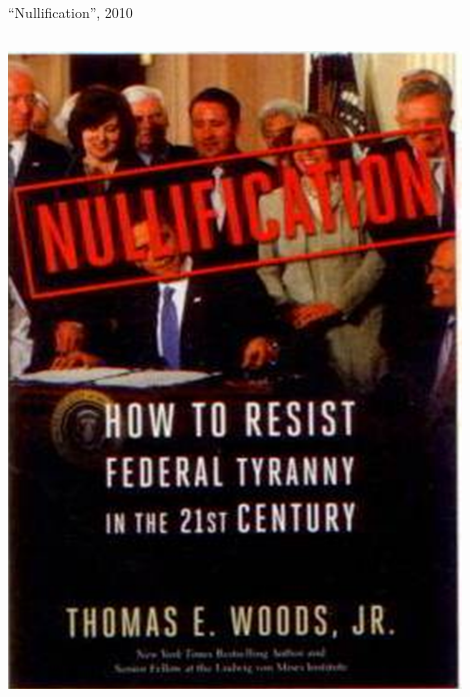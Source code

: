 \begin{frame}{``Nullification'', 2010}
    \begin{columns}[c]
            \centering
            \includegraphics[width=0.9\textwidth]{img/nullification.png} \\
        \column{0.5\textheight}
            \centering

\end{columns}
\end{frame}

